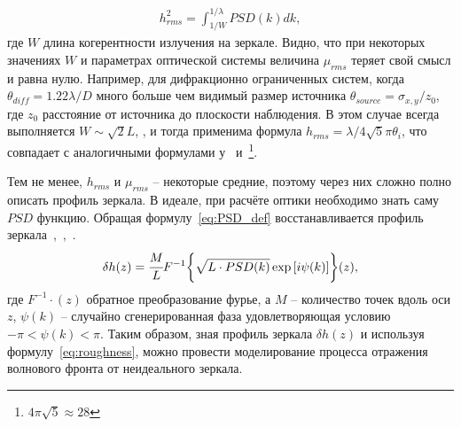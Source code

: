 \begin{align}
	h^2_{rms} =  \int^{1/\lambda}_{1/W} PSD(k) dk,
\end{align}
где $W$ длина когерентности излучения на зеркале. Видно, что при некоторых значениях $W$ и параметрах оптической системы величина $\mu_{rms}$ теряет свой смысл и равна нулю. Например, для дифракционно ограниченных систем, когда $\theta_{diff} = 1.22 \lambda / D$ много больше чем видимый размер источника $\theta_{source} = \sigma_{x, y}/z_0$, где $z_0$ расстояние от источника до плоскости наблюдения. В этом случае всегда выполняется $W \sim \sqrt{2} L$, \cite{pardini_effect_2015}, и тогда применима формула $h_{rms} = \lambda / 4 \sqrt{5} \pi \theta_i$, что совпадает с аналогичными формулами у~\cite{serkez_design_2015} и~\cite{heimann_linac_2011}\footnote{$4 \pi \sqrt{5}  \approx 28$ }.

Тем не менее, $h_{rms}$ и $\mu_{rms}$ -- некоторые средние, поэтому через них сложно полно описать профиль зеркала. В идеале, при расчёте оптики необходимо знать саму $PSD$ функцию. Обращая формулу~\ref{eq:PSD_def} восстанавливается профиль зеркала~\cite{hua_using_2013},~\cite{xu_statistical_2012},~\cite{barty_predicting_2009}.
\begin{align}
	\delta h(z) = \cfrac{M}{L} F^{-1} \bigg\{\sqrt{L \cdot PSD(k)} \exp{[i \psi(k)]} \bigg\}(z),
\end{align}
где $F^{-1}{\cdot}(z)$ обратное преобразование фурье, а $M$ -- количество точек вдоль оси $z$, $\psi(k)$ -- случайно сгенерированная фаза удовлетворяющая условию $-\pi < \psi(k) <\pi$. Таким образом, зная профиль зеркала $\delta h(z)$ и используя формулу~\ref{eq:roughness}, можно провести моделирование процесса отражения волнового фронта от неидеального зеркала.

